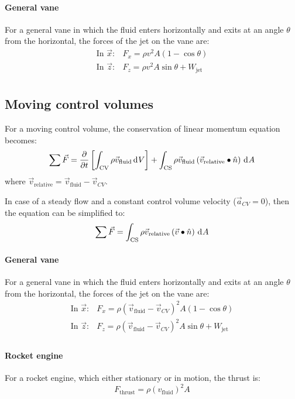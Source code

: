 \documentclass[10pt, twocolumn]{article}
\begin{document}
\paragraph{General vane}
For a general vane in which the fluid enters horizontally and exits at an angle \(\theta\) from the horizontal, the forces of the jet on the vane are:
\begin{align*}
  \text{In } \vec{x}: & F_x = \rho v^2 A (1 - \cos\theta)            \\
  \text{In } \vec{z}: & F_z = \rho v^2 A \sin\theta + W_\mathrm{jet} \\
\end{align*}

\subsection{Moving control volumes}
For a moving control volume, the conservation of linear momentum equation becomes:
\[
  \sum{\vec{F}} = \frac{\partial }{\partial t} \left[ \int_\mathrm{CV}{\rho \vec{v}_\mathrm{fluid} \,\mathrm{d}^{} V} \right] + \int_\mathrm{CS}{\rho \vec{v}_\mathrm{fluid} \left( \vec{v}_\mathrm{relative} \bullet \hat{n} \right) \,\mathrm{d}^{} A}
\]
where \(\vec{v}_\mathrm{relative} = \vec{v}_\mathrm{fluid} - \vec{v}_{CV}\).

In case of a steady flow and a constant control volume velocity (\(\vec{a}_{CV} = 0\)), then the equation can be simplified to:
\[
  \sum{\vec{F}} = \int_\mathrm{CS}{\rho \vec{v}_\mathrm{relative} \left( \vec{v} \bullet \hat{n} \right) \,\mathrm{d}^{} A}
\]


\paragraph{General vane}
For a general vane in which the fluid enters horizontally and exits at an angle \(\theta\) from the horizontal, the forces of the jet on the vane are:
\begin{align*}
  \text{In } \vec{x}: & F_x = \rho (\vec{v}_\mathrm{fluid} - \vec{v}_{CV})^2 A (1 - \cos\theta)            \\
  \text{In } \vec{z}: & F_z = \rho (\vec{v}_\mathrm{fluid} - \vec{v}_{CV})^2 A \sin\theta + W_\mathrm{jet} \\
\end{align*}


\paragraph{Rocket engine}
For a rocket engine, which either stationary or in motion, the thrust is:
\[
  F_\mathrm{thrust} = \rho (v_\mathrm{fluid})^2 A
\]
\end{document}
